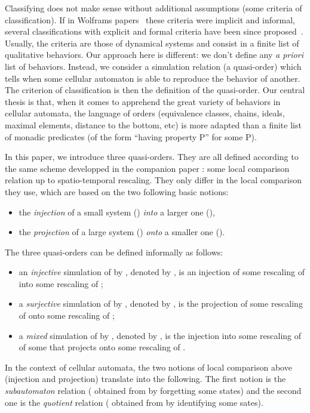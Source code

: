 \documentclass[a4paper]{elsarticle}
\begin{document}
Classifying does not make sense without additional assumptions (some
criteria of classification). If in Wolframs
papers~\cite{Wolfram:1984:CTCA} these criteria were implicit and
informal, several classifications with explicit and formal criteria
have been since
proposed~\cite{Gilman:1987:CLA,Cattaneo:1999:TDD,Kurka97}. Usually,
the criteria are those of dynamical systems and consist in a finite
list of qualitative behaviors. Our approach here is different: we
don't define any \textit{a priori} list of behaviors. Instead, we
consider a simulation relation (a quasi-order) which tells when some
cellular automaton is able to reproduce the behavior of another. The
criterion of classification is then the definition of the
quasi-order. Our central thesis is that, when it comes to apprehend
the great variety of behaviors in cellular automata, the language of
orders (equivalence classes, chains, ideals, maximal elements,
distance to the bottom, etc) is more adapted than a finite list of
monadic predicates (of the form ``having property P'' for some P).

In this paper, we introduce three quasi-orders. They are all defined
according to the same scheme developped in the companion paper
\cite{bulking1}: some local comparison relation up to spatio-temporal
rescaling. They only differ in the local comparison they use, which
are based on the two following basic notions:
\begin{itemize}
\item the \emph{injection} of a small system () \emph{into} a larger one (),
\item the \emph{projection} of a large system () \emph{onto} a smaller one ().
\end{itemize}

The three quasi-orders can be defined informally as follows:
\begin{itemize}
\item an \emph{injective} simulation of  by , denoted by , is an injection of some rescaling of  into some
  rescaling of ;
\item a \emph{surjective} simulation of  by , denoted by , is the projection of some rescaling of  onto some
  rescaling of ;
\item a \emph{mixed} simulation of  by , denoted by , is the injection into some rescaling of  of some
   that projects onto some rescaling of .
\end{itemize}

In the context of cellular automata, the two notions of local
comparison above (injection and projection) translate into the
following.  The first notion is the \emph{subautomaton} relation (
obtained from  by forgetting some states) and the second one is the
\emph{quotient} relation ( obtained from  by identifying some
sates). 
\end{document}
